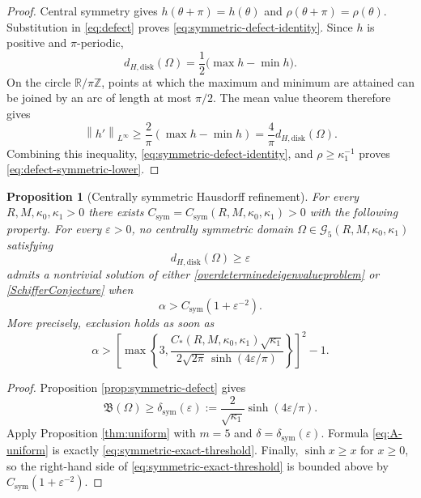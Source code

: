 \documentclass[12pt]{article}
\newcommand{\R}{\mathbb{R}}
\numberwithin{equation}{section}
\newtheorem{proposition}[theorem]{Proposition}
\numberwithin{equation}{section}
\newcommand{\cG}{\mathcal{G}}
\begin{document}
\begin{proof}
Central symmetry gives
$h(\theta+\pi)=h(\theta)$ and
$\rho(\theta+\pi)=\rho(\theta)$. Substitution in
\eqref{eq:defect} proves \eqref{eq:symmetric-defect-identity}.
Since $h$ is positive and $\pi$-periodic,
\begin{equation*}\label{eq:H-oscillation}
 d_{H,{\mathrm{disk}}}(\Omega)
 =\frac12\bigl(\max h-\min h\bigr).
\end{equation*}
On the circle $\R/\pi\mathbb Z$, points at which the maximum and minimum
are attained can be joined by an arc of length at most $\pi/2$. The mean
value theorem therefore gives
\begin{equation*}\label{eq:H-derivative}
 \left\|h'\right\|_{L^\infty}
 \geq\frac{2}{\pi}\left(\max h-\min h\right)
 =\frac{4}{\pi}d_{H,{\mathrm{disk}}}(\Omega).
\end{equation*}
Combining this inequality, \eqref{eq:symmetric-defect-identity}, and
$\rho\geq\kappa_1^{-1}$ proves \eqref{eq:defect-symmetric-lower}.
\end{proof}

\begin{proposition}[Centrally symmetric Hausdorff refinement]
\label{thm:symmetric-H}
For every $R,M,\kappa_0,\kappa_1>0$ there exists
$C_{\mathrm{sym}}=C_{\mathrm{sym}}\left(R,M,\kappa_0,\kappa_1\right)>0$ with the following
property. For every $\varepsilon>0$, no centrally symmetric domain
$\Omega\in\cG_5\left(R,M,\kappa_0,\kappa_1\right)$ satisfying
\[
 d_{H,{\mathrm{disk}}}(\Omega)\geq\varepsilon
\]
admits a nontrivial solution of either \eqref{overdeterminedeigenvalueproblem} or \eqref{SchifferConjecture} when
\begin{equation*}\label{eq:symmetric-polynomial-threshold}
 \alpha>C_{\mathrm{sym}}\left(1+\varepsilon^{-2}\right).
\end{equation*}
More precisely, exclusion holds as soon as
\begin{equation}\label{eq:symmetric-exact-threshold}
 \alpha>
 \left[
 \max\left\{3,
 \frac{C_*\left(R,M,\kappa_0,\kappa_1\right)\sqrt{\kappa_1}}
 {2\sqrt{2\pi}\,\sinh\left(4\varepsilon/\pi\right)}
 \right\}
 \right]^2-1.
\end{equation}
\end{proposition}

\begin{proof}
Proposition \ref{prop:symmetric-defect} gives
\[
 \mathfrak B(\Omega)\geq
 \delta_{\mathrm{sym}}(\varepsilon):=
 \frac{2}{\sqrt{\kappa_1}}\sinh\left(4\varepsilon/\pi\right).
\]
Apply Proposition \ref{thm:uniform} with $m=5$ and
$\delta=\delta_{\mathrm{sym}}(\varepsilon)$. Formula \eqref{eq:A-uniform}
is exactly \eqref{eq:symmetric-exact-threshold}. Finally,
$\sinh x\geq x$ for $x\geq0$, so the right-hand side of
\eqref{eq:symmetric-exact-threshold} is bounded above by
$C_{\mathrm{sym}}\left(1+\varepsilon^{-2}\right)$.
\end{proof}
\end{document}
